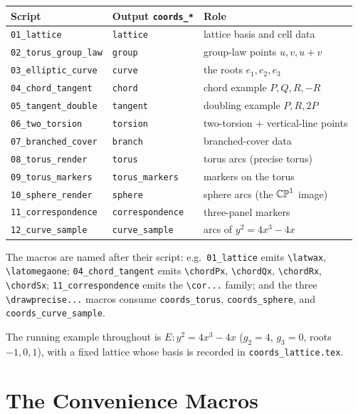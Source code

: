 \begin{center}
\footnotesize
\begin{tabular}{@{}lll@{}}
\hline
Script & Output \texttt{coords\_*} & Role\\
\hline
\texttt{01\_lattice}          & \texttt{lattice}        & lattice basis and cell data\\
\texttt{02\_torus\_group\_law}& \texttt{group}          & group-law points $u,v,u{+}v$\\
\texttt{03\_elliptic\_curve}  & \texttt{curve}          & the roots $e_1,e_2,e_3$\\
\texttt{04\_chord\_tangent}   & \texttt{chord}          & chord example $P,Q,R,-R$\\
\texttt{05\_tangent\_double}  & \texttt{tangent}        & doubling example $P,R,2P$\\
\texttt{06\_two\_torsion}     & \texttt{torsion}        & two-torsion + vertical-line points\\
\texttt{07\_branched\_cover}  & \texttt{branch}         & branched-cover data\\
\texttt{08\_torus\_render}    & \texttt{torus}          & torus arcs (precise torus)\\
\texttt{09\_torus\_markers}   & \texttt{torus\_markers} & markers on the torus\\
\texttt{10\_sphere\_render}   & \texttt{sphere}         & sphere arcs (the $\mathbb{CP}^1$ image)\\
\texttt{11\_correspondence}   & \texttt{correspondence} & three-panel markers\\
\texttt{12\_curve\_sample}    & \texttt{curve\_sample}  & arcs of $y^2=4x^3-4x$\\
\hline
\end{tabular}
\end{center}

\noindent The macros are named after their script: e.g.\ \texttt{01\_lattice}
emits \verb|\latwax|, \verb|\latomegaone|; \texttt{04\_chord\_tangent} emits
\verb|\chordPx|, \verb|\chordQx|, \verb|\chordRx|, \verb|\chordSx|;
\texttt{11\_correspondence} emits the \verb|\cor...| family; and the three
\verb|\drawprecise...| macros consume \texttt{coords\_torus}, \texttt{coords\_sphere},
and \texttt{coords\_curve\_sample}.

The running example throughout is \(E : y^2 = 4x^3 - 4x\) (\(g_2 = 4\), \(g_3 = 0\),
roots \(-1, 0, 1\)), with a fixed lattice whose basis is recorded in
\texttt{coords\_lattice.tex}.

\section{The Convenience Macros}
\label{sec:C-macros}

